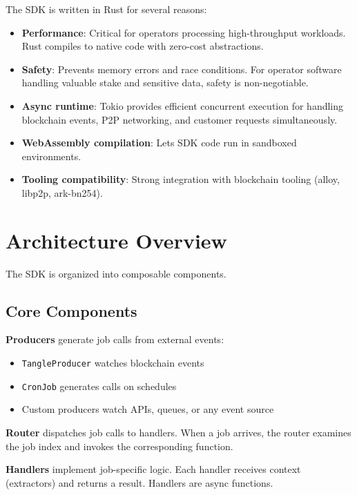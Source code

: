 \documentclass[11pt,a4paper]{article}
\begin{document}
The SDK is written in Rust for several reasons:

\begin{itemize}
    \item \textbf{Performance}: Critical for operators processing high-throughput workloads. Rust compiles to native code with zero-cost abstractions.
    \item \textbf{Safety}: Prevents memory errors and race conditions. For operator software handling valuable stake and sensitive data, safety is non-negotiable.
    \item \textbf{Async runtime}: Tokio provides efficient concurrent execution for handling blockchain events, P2P networking, and customer requests simultaneously.
    \item \textbf{WebAssembly compilation}: Lets SDK code run in sandboxed environments.
    \item \textbf{Tooling compatibility}: Strong integration with blockchain tooling (alloy, libp2p, ark-bn254).
\end{itemize}

\section{Architecture Overview}

The SDK is organized into composable components.

\subsection{Core Components}

\textbf{Producers} generate job calls from external events:
\begin{itemize}[noitemsep]
    \item \texttt{TangleProducer} watches blockchain events
    \item \texttt{CronJob} generates calls on schedules
    \item Custom producers watch APIs, queues, or any event source
\end{itemize}

\textbf{Router} dispatches job calls to handlers. When a job arrives, the router examines the job index and invokes the corresponding function.

\textbf{Handlers} implement job-specific logic. Each handler receives context (extractors) and returns a result. Handlers are async functions.
\end{document}
